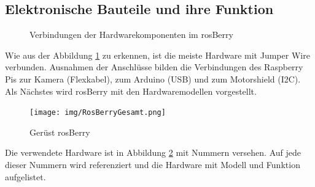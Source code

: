 \documentclass[conference]{IEEEtran}
\begin{document}
	\subsection{Elektronische Bauteile und ihre Funktion}
	\begin{figure} %
		\centering
		\def\svgwidth{9cm}
		
		\caption{Verbindungen der Hardwarekomponenten im rosBerry}
		\label{Hardwarekomponenten}
	\end{figure}
	
	Wie aus der Abbildung \ref{Hardwarekomponenten} zu erkennen, ist die meiste Hardware mit Jumper Wire verbunden.
	Ausnahmen der Anschlüsse bilden die Verbindungen des Raspberry Pis zur Kamera (Flexkabel), zum Arduino (USB) und zum Motorshield (I2C).
	\\
	
	Als Nächstes wird rosBerry mit den Hardwaremodellen vorgestellt.
	\\
	\begin{figure}[!ht]
		\centering
		\texttt{[image: img/RosBerryGesamt.png]}
		\caption{Gerüst rosBerry}
		\label{rosBerryGesamt}
	\end{figure}
	
	Die verwendete Hardware ist in Abbildung \ref{rosBerryGesamt} mit Nummern versehen.
	Auf jede dieser Nummern wird referenziert und die Hardware mit Modell und Funktion aufgelistet.
	
\end{document}
